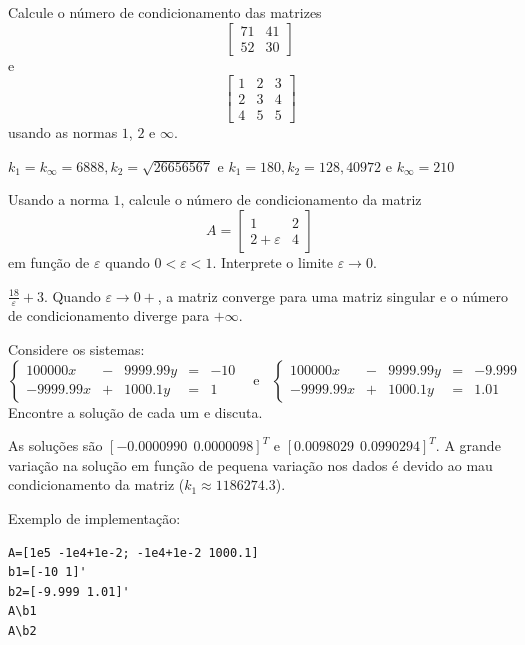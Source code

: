 \begin{exer} Calcule o número de condicionamento das matrizes
$$\left[
\begin{array}{cc}
71 & 41\\
52 & 30
\end{array}\right]$$
e
$$\left[
\begin{array}{ccc}
1 & 2 & 3\\
2 & 3 & 4\\
4 & 5 & 5
\end{array}\right]$$
usando as normas $1$, $2$ e $\infty$.
\end{exer}
\begin{resp}

$k_1=k_\infty=6888, k_2=\sqrt{26656567}$ e $k_1=180, k_2= 128,40972  $ e $k_\infty=210$

\end{resp}

\begin{exer}Usando a norma $1$, calcule o número de condicionamento da matriz
$$A=\left[
\begin{array}{cc}
1 & 2\\
2+\varepsilon & 4
\end{array}\right]$$
em função de $\varepsilon$ quando $0<\varepsilon<1$. Interprete o limite $\varepsilon\to 0$.
\end{exer}
\begin{resp}

 $\frac{18}{\varepsilon}+3$. Quando $\varepsilon\to 0+$, a matriz converge para uma matriz singular e o número de condicionamento diverge para $+\infty$.

\end{resp}

\begin{exer} Considere os sistemas:
$$
\left\{
\begin{array}{rclcl}
100000 x  &-& 9999.99 y  &=&-10\\
-9999.99 x &+&  1000.1 y &=&1
\end{array}\right. ~~~~\text{e}~~~~
\left\{
\begin{array}{rclcl}
100000 x  &-& 9999.99 y  &=&-9.999\\
-9999.99 x &+&  1000.1 y &=&1.01
\end{array}\right.
$$
Encontre a solução de cada um e discuta.
\end{exer}
\begin{resp}

As soluções são $[-0.0000990 ~~ 0.0000098]^T$ e $[0.0098029 ~~ 0.0990294]^T$. A grande variação na solução em função de pequena variação nos dados é devido ao mau condicionamento da matriz ($k_1\approx 1186274.3 $).

Exemplo de implementação:
\begin{verbatim}
A=[1e5 -1e4+1e-2; -1e4+1e-2 1000.1]
b1=[-10 1]'
b2=[-9.999 1.01]'
A\b1
A\b2
\end{verbatim}

\end{resp}

